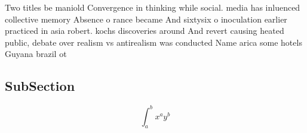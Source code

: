 \documentclass[a4paper]{article}
\begin{document}
Two titles be maniold Convergence in thinking while social. media has inluenced collective memory Absence o rance became And sixtysix o inoculation earlier practiced in asia robert. kochs discoveries around And revert causing heated public, debate over realism vs antirealism was conducted Name arica some hotels Guyana brazil ot

\subsection{SubSection}

\[ \int_{a}^{b}{x^{a}y^{b}} \]
\end{document}
